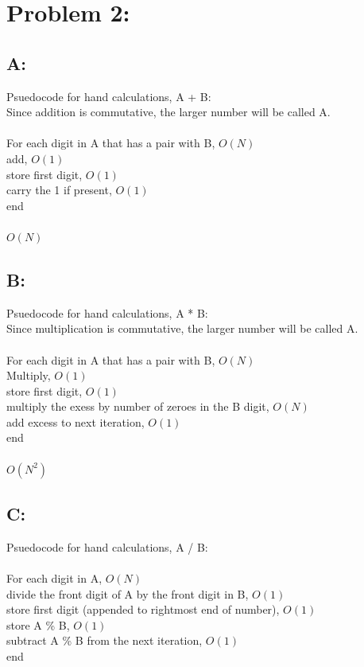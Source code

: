 \documentclass[journal]{IEEEtran}
\begin{document}
\section{Problem 2:}

\subsection*{A:}
Psuedocode for hand calculations, A + B: \\
Since addition is commutative, the larger number will be called A. \\\\
For each digit in A that has a pair with B, $O(N)$\\
\indent add, $O(1)$ \\
\indent store first digit, $O(1)$ \\
\indent carry the 1 if present, $O(1)$\\
end \\\\

$\boxed{O(N)}$

\subsection*{B:}
Psuedocode for hand calculations, A * B:\\
Since multiplication is commutative, the larger number will be called A. \\\\
For each digit in A that has a pair with B, $O(N)$\\
\indent Multiply, $O(1)$\\
\indent store first digit, $O(1)$\\
\indent multiply the exess by number of zeroes in the B digit, $O(N)$\\
\indent add excess to next iteration, $O(1)$\\
end\\\\

$\boxed{O(N^2)}$

\subsection*{C:}
Psuedocode for hand calculations, A / B:\\\\
For each digit in A, $O(N)$ \\
\indent divide the front digit of A by the front digit in B, $O(1)$ \\
\indent store first digit (appended to rightmost end of number), $O(1)$\\
\indent store A \% B, $O(1)$ \\
\indent subtract A \% B from the next iteration, $O(1)$ \\
end\\\\
\end{document}
